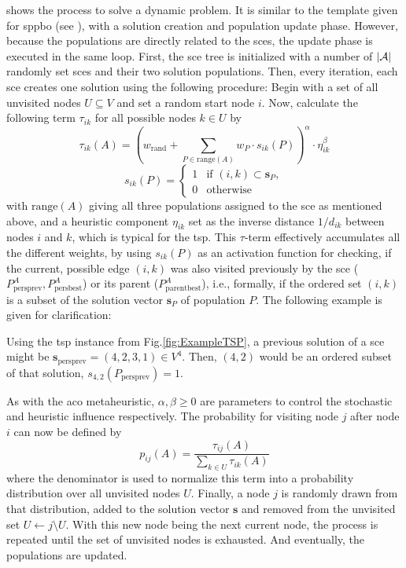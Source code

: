  shows the process to solve a dynamic problem. It is similar to the template given for \gls{sppbo} (see ), with a solution creation and population update phase. However, because the populations are directly related to the \glspl{sce}, the update phase is executed in the same loop.
First, the \gls{sce} tree is initialized with a number of $\left\lvert\mathcal{A}\right\rvert$ randomly set \glspl{sce} and their two solution populations.
Then, every iteration, each \gls{sce} creates one solution using the following procedure: Begin with a set of all unvisited nodes $U \subseteq V$ and set a random start node $i$. Now, calculate the following term $\tau_{ik}$ for all possible nodes $k \in U$ by
\begin{equation}
	\label{eq:hsppbo_tau}
	\tau_{ik}(A) = \left(  w_{\text{rand}} + \sum_{P\in \text{range}(A)} w_P \cdot s_{ik}(P)  \right)^\alpha \cdot \eta^\beta_{ik}
\end{equation}
\begin{equation*}
	s_{ik}(P) = \begin{cases}
		1 & \text{if $(i,k) \subset \mathbf{s}_P$},\\
		0 & \text{otherwise}
	\end{cases}
\end{equation*}
with $\text{range}(A)$ giving all three populations assigned to the \gls{sce} as mentioned above, and a heuristic component $\eta_{ik}$ set as the inverse distance $1 / d_{ik}$ between nodes $i$ and $k$, which is typical for the \gls{tsp}. This $\tau$-term effectively accumulates all the different weights, by using $s_{ik}(P)$ as an activation function for checking, if the current, possible edge $(i,k)$ was also visited previously by the \gls{sce} ($P^{A}_{\text{persprev}}, P^{A}_{\text{persbest}}$) or its parent ($P^{A}_{\text{parentbest}}$), i.e., formally, if the ordered set $(i,k)$ is a subset of the solution vector $\mathbf{s}_P$ of population $P$. The following example is given for clarification:
\begin{example}
	\label{ex:subset}
Using the \gls{tsp} instance from Fig.\ref{fig:ExampleTSP}, a previous solution of a \gls{sce} might be $\mathbf{s}_\text{persprev} = (4,2,3,1) \in V^4$. Then, $(4,2)$ would be an ordered subset of that solution, $s_{4,2}(P_\text{persprev}) = 1$.
\end{example}
As with the \gls{aco} metaheuristic, $\alpha, \beta \geq 0$ are parameters to control the stochastic and heuristic influence respectively. 
The probability for visiting node $j$ after node $i$ can now be defined by
\begin{equation}
	\label{eq:hsppbo_prob}
	p_{ij}(A) = \frac{\tau_{ij}(A)}{\sum_{k \in U} \tau_{ik}(A)}
\end{equation}
where the denominator is used to normalize this term into a probability distribution over all unvisited nodes $U$. Finally, a node $j$ is randomly drawn from that distribution, added to the solution vector $\mathbf{s}$ and removed from the unvisited set $U \gets {j}\setminus U$. With this new node being the next current node, the process is repeated until the set of unvisited nodes is exhausted. And eventually, the populations are updated.

